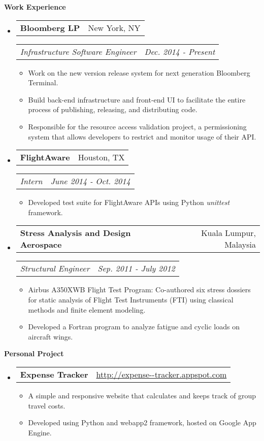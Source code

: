 \documentclass[letterpaper,11pt]{article}
\makeatletter
\newcommand{\resitem}[1]{\item #1 \vspace{-2pt}}
\newcommand{\resheading}[1]{{\begin{mdframed}[backgroundcolor=mygray]{\large \textbf{#1}}\end{mdframed}}}
\newcommand{\restitle}[2]{
\begin{tabular*}{7.0in}{l@{\extracolsep{\fill}}r}
		\textbf{#1} & #2 \\
\end{tabular*}}
\newcommand{\ressubtitle}[2]{
\begin{tabular*}{7.0in}{l@{\extracolsep{\fill}}r}
		\textit{#1} & \textit{#2} \\
\end{tabular*}\vspace{-6pt}}
\makeatother
\begin{document}
\resheading{Work Experience}
\begin{itemize}

\item
	\restitle{Bloomberg LP}{New York, NY}
	\ressubtitle{Infrastructure Software Engineer}{Dec. 2014 - Present}
	\begin{itemize}
		\resitem{Work on the new version release system for next generation Bloomberg Terminal.}
		\resitem{Build back-end infrastructure and front-end UI to facilitate the entire process of publishing, releasing, and distributing code.}
		\resitem{Responsible for the resource access validation project, a permissioning system that allows developers to restrict and monitor usage of their API.}
	\end{itemize}

\item
	\restitle{FlightAware}{Houston, TX}
	\ressubtitle{Intern}{June 2014 - Oct. 2014}
	\begin{itemize}
		\resitem{Developed test suite for FlightAware APIs using Python \emph{unittest} framework.}
	\end{itemize}

\item
	\restitle{Stress Analysis and Design Aerospace}{Kuala Lumpur, Malaysia}
	\ressubtitle{Structural Engineer}{Sep. 2011 - July 2012}
	\begin{itemize}
		\resitem{Airbus A350XWB Flight Test Program: Co-authored six stress dossiers for static analysis of Flight Test Instruments (FTI) using classical methods and finite element modeling.}
		\resitem{Developed a Fortran program to analyze fatigue and cyclic loads on aircraft wings.}
	\end{itemize}

\end{itemize}

\resheading{Personal Project}

\begin{itemize}
\item
	\restitle{Expense Tracker}{\href{http://expense--tracker.appspot.com/}{http://expense-{}-tracker.appspot.com}}
	\vspace{-6pt}
	\begin{itemize}
		\resitem{A simple and responsive website that calculates and keeps track of group travel costs.}
		\resitem{Developed using Python and webapp2 framework, hosted on Google App Engine.}
	\end{itemize}
\end{itemize}
\end{document}

